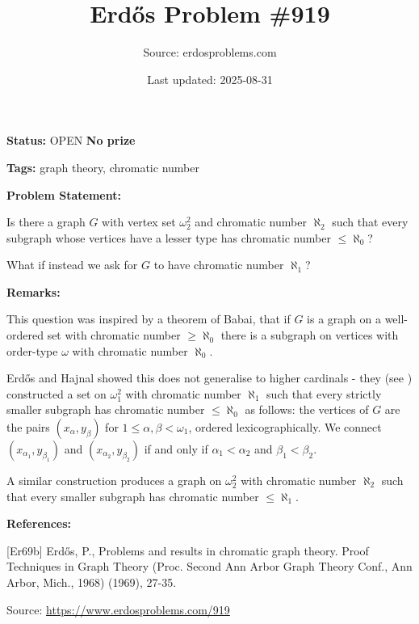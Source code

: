 \documentclass{article}
\title{Erd\H{o}s Problem \#919}
\date{Last updated: 2025-08-31}
\author{Source: erdosproblems.com}
\begin{document}
\maketitle

\noindent\textbf{Status:} OPEN \quad \textbf{No prize}

\noindent\textbf{Tags:} graph theory, chromatic number

\medskip
\noindent\textbf{Problem Statement:}

Is there a graph $G$ with vertex set $\omega_2^2$ and chromatic number $\aleph_2$ such that every subgraph whose vertices have a lesser type has chromatic number $\leq \aleph_0$?

What if instead we ask for $G$ to have chromatic number $\aleph_1$?

\bigskip
\noindent\textbf{Remarks:}

This question was inspired by a theorem of Babai, that if $G$ is a graph on a well-ordered set with chromatic number $\geq \aleph_0$ there is a subgraph on vertices with order-type $\omega$ with chromatic number $\aleph_0$.

Erd\H{o}s and Hajnal showed this does not generalise to higher cardinals - they (see \cite{Er69b}) constructed a set on $\omega_1^2$ with chromatic number $\aleph_1$ such that every strictly smaller subgraph has chromatic number $\leq \aleph_0$ as follows: the vertices of $G$ are the pairs $(x_\alpha,y_\beta)$ for $1\leq \alpha,\beta <\omega_1$, ordered lexicographically. We connect $(x_{\alpha_1},y_{\beta_1})$ and $(x_{\alpha_2},y_{\beta_2})$ if and only if $\alpha_1<\alpha_2$ and $\beta_1<\beta_2$.

A similar construction produces a graph on $\omega_2^2$ with chromatic number $\aleph_2$ such that every smaller subgraph has chromatic number $\leq \aleph_1$.

\bigskip
\noindent\textbf{References:}

[Er69b] Erd\H{o}s, P., Problems and results in chromatic graph theory. Proof Techniques in Graph Theory (Proc. Second Ann
Arbor Graph Theory Conf., Ann Arbor, Mich.,
1968) (1969), 27-35.

\bigskip
\noindent\small{Source: \url{https://www.erdosproblems.com/919}}
\end{document}
